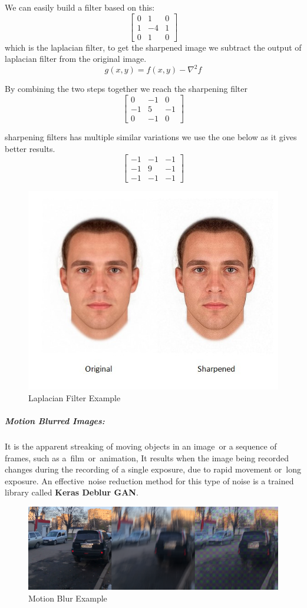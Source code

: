 We can easily build a filter based on this:
\[
\begin{bmatrix}
0 & 1 & 0 \\
1 & -4 & 1 \\
0 & 1 & 0
\end{bmatrix} \]
which is the laplacian filter, to get the sharpened image we subtract the output of laplacian filter from the original image.
\[g(x, y) = f(x, y) - \nabla^{2} f\]

By combining the two steps together we reach the sharpening filter
\[
\begin{bmatrix}
0 & -1 & 0 \\
-1 & 5 & -1 \\
0 & -1 & 0
\end{bmatrix} \]

sharpening filters has multiple similar variations we use the one below as it gives better results.
\[
\begin{bmatrix}
-1 & -1 & -1 \\
-1 & 9 & -1 \\
-1 & -1 & -1
\end{bmatrix} \]

\begin{figure}[H]
	\centering
	\includegraphics[width=0.5\linewidth]{images/Sharpened.jpg}
	\caption{Laplacian Filter Example}
	\label{figure:laplacian}
\end{figure}

\subparagraph{Motion Blurred Images:}
It is the apparent streaking of moving objects in an image or a sequence of frames, such as a film or animation, It results when the image being recorded changes during the recording of a single exposure, due to rapid movement or long exposure.\newline
An effective noise reduction method for this type of noise is a trained library called \textbf{Keras Deblur GAN}.\newline
\begin{figure}[H]
	\centering
	\includegraphics[width=\linewidth]{images/motion_blur.png}
	\caption{Motion Blur Example}
\end{figure}

